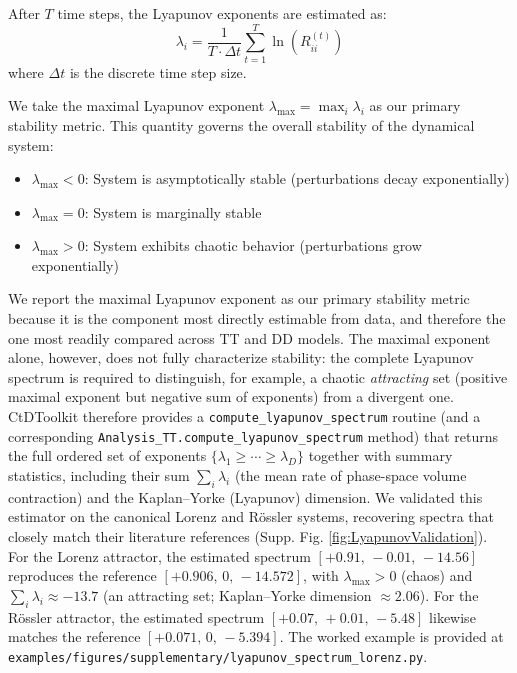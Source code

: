 \documentclass{article}
\begin{document}
After $T$ time steps, the Lyapunov exponents are estimated as:
$$\lambda_i = \frac{1}{T \cdot \Delta t} \sum_{t=1}^{T} \ln(R_{ii}^{(t)})$$
where $\Delta t$ is the discrete time step size.

We take the maximal Lyapunov exponent $\lambda_{\max} = \max_i \lambda_i$ as our primary stability metric. This quantity governs the overall stability of the dynamical system:
\begin{itemize}
\item $\lambda_{\max} < 0$: System is asymptotically stable (perturbations decay exponentially)
\item $\lambda_{\max} = 0$: System is marginally stable
\item $\lambda_{\max} > 0$: System exhibits chaotic behavior (perturbations grow exponentially)
\end{itemize}

We report the maximal Lyapunov exponent as our primary stability metric because it is the component most directly estimable from data, and therefore the one most readily compared across TT and DD models. The maximal exponent alone, however, does not fully characterize stability: the complete Lyapunov spectrum is required to distinguish, for example, a chaotic \emph{attracting} set (positive maximal exponent but negative sum of exponents) from a divergent one. CtDToolkit therefore provides a \texttt{compute\_lyapunov\_spectrum} routine (and a corresponding \texttt{Analysis\_TT.compute\_lyapunov\_spectrum} method) that returns the full ordered set of exponents $\{\lambda_1 \geq \cdots \geq \lambda_D\}$ together with summary statistics, including their sum $\sum_i \lambda_i$ (the mean rate of phase-space volume contraction) and the Kaplan--Yorke (Lyapunov) dimension. We validated this estimator on the canonical Lorenz and R\"ossler systems, recovering spectra that closely match their literature references (Supp. Fig. \ref{fig:LyapunovValidation}). For the Lorenz attractor, the estimated spectrum $[+0.91,\, -0.01,\, -14.56]$ reproduces the reference $[+0.906,\, 0,\, -14.572]$, with $\lambda_{\max}>0$ (chaos) and $\sum_i \lambda_i \approx -13.7$ (an attracting set; Kaplan--Yorke dimension $\approx 2.06$). For the R\"ossler attractor, the estimated spectrum $[+0.07,\, +0.01,\, -5.48]$ likewise matches the reference $[+0.071,\, 0,\, -5.394]$. The worked example is provided at \texttt{examples/figures/supplementary/lyapunov\_spectrum\_lorenz.py}.
\end{document}
